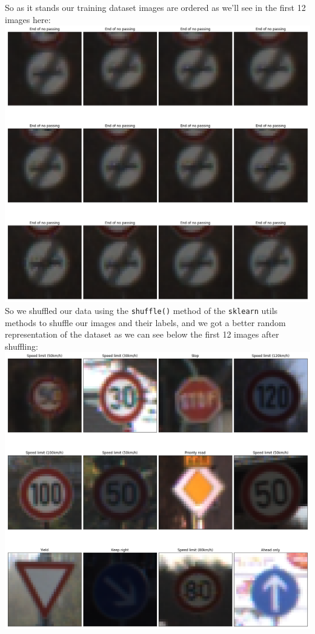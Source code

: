 \documentclass[11pt]{article}
\makeatletter
\def\maxwidth{\ifdim\Gin@nat@width>\linewidth\linewidth
    \else\Gin@nat@width\fi}
\let\Oldincludegraphics\includegraphics
\renewcommand{\includegraphics}[1]{\Oldincludegraphics[width=.8\maxwidth]{#1}}
\makeatother
\begin{document}
So as it stands our training dataset images are ordered as we'll see in
the first 12 images here: \includegraphics{./assets/first_12_images.png}
So we shuffled our data using the \texttt{shuffle()} method of the
\texttt{sklearn} utils methods to shuffle our images and their labels,
and we got a better random representation of the dataset as we can see
below the first 12 images after shuffling:
\includegraphics{./assets/random_first_12.png}
\end{document}
